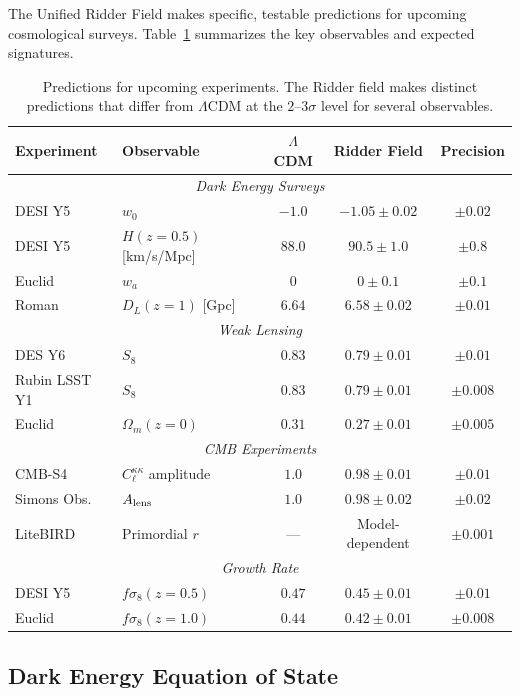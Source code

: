 \documentclass[twocolumn,showpacs,preprintnumbers,amsmath,amssymb,prd]{revtex4-2}
\begin{document}
The Unified Ridder Field makes specific, testable predictions for upcoming cosmological surveys. Table~\ref{tab:predictions} summarizes the key observables and expected signatures.

\begin{table}[t]
\centering
\begin{tabular}{llccc}
\toprule
Experiment & Observable & $\Lambda$CDM & Ridder Field & Precision \\
\midrule
\multicolumn{5}{c}{\textit{Dark Energy Surveys}} \\
\midrule
DESI Y5 & $w_0$ & $-1.0$ & $-1.05 \pm 0.02$ & $\pm 0.02$ \\
DESI Y5 & $H(z=0.5)$ [km/s/Mpc] & $88.0$ & $90.5 \pm 1.0$ & $\pm 0.8$ \\
Euclid & $w_a$ & $0$ & $0 \pm 0.1$ & $\pm 0.1$ \\
Roman & $D_L(z=1)$ [Gpc] & $6.64$ & $6.58 \pm 0.02$ & $\pm 0.01$ \\
\midrule
\multicolumn{5}{c}{\textit{Weak Lensing}} \\
\midrule
DES Y6 & $S_8$ & $0.83$ & $0.79 \pm 0.01$ & $\pm 0.01$ \\
Rubin LSST Y1 & $S_8$ & $0.83$ & $0.79 \pm 0.01$ & $\pm 0.008$ \\
Euclid & $\Omega_m(z=0)$ & $0.31$ & $0.27 \pm 0.01$ & $\pm 0.005$ \\
\midrule
\multicolumn{5}{c}{\textit{CMB Experiments}} \\
\midrule
CMB-S4 & $C_\ell^{\kappa\kappa}$ amplitude & $1.0$ & $0.98 \pm 0.01$ & $\pm 0.01$ \\
Simons Obs. & $A_{\rm lens}$ & $1.0$ & $0.98 \pm 0.02$ & $\pm 0.02$ \\
LiteBIRD & Primordial $r$ & --- & Model-dependent & $\pm 0.001$ \\
\midrule
\multicolumn{5}{c}{\textit{Growth Rate}} \\
\midrule
DESI Y5 & $f\sigma_8(z=0.5)$ & $0.47$ & $0.45 \pm 0.01$ & $\pm 0.01$ \\
Euclid & $f\sigma_8(z=1.0)$ & $0.44$ & $0.42 \pm 0.01$ & $\pm 0.008$ \\
\bottomrule
\end{tabular}
\caption{Predictions for upcoming experiments. The Ridder field makes distinct predictions that differ from $\Lambda$CDM at the $2$--$3\sigma$ level for several observables.}
\label{tab:predictions}
\end{table}

\subsection{Dark Energy Equation of State}
\end{document}
